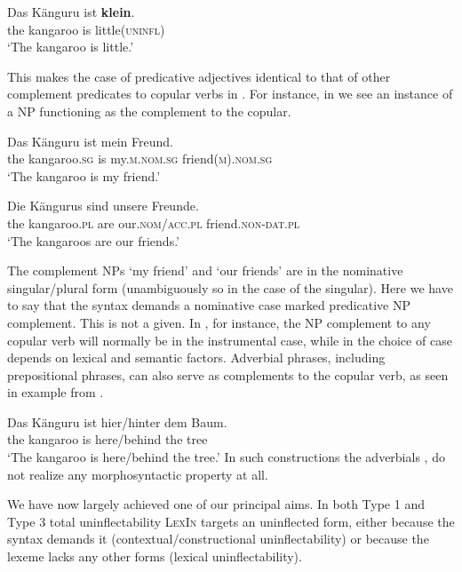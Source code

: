 \documentclass[output=paper,colorlinks,citecolor=brown]{langscibook}
\begin{document}
\begin{exe}
	\gll Das Känguru ist \textbf{klein}. \\
	the kangaroo is little\textsc{(uninfl)} \\
	\glt `The kangaroo is little.’
\end{exe}
	
\noindent%
This makes the case of predicative adjectives identical to that of other complement predicates to copular verbs in . For instance, in 
we see an instance of a NP functioning as  the complement to the copular.

\ea\label{freund}
\begin{xlist}
	\ex 
	\gll	Das Känguru ist mein Freund.	\\
	the kangaroo.\textsc{sg} is my.\textsc{m.nom.sg} friend\textsc{(m).nom.sg}	\\
	\glt	`The kangaroo is my friend.'

	\ex
	\gll	Die Kängurus sind unsere Freunde.	\\
	the kangaroo.\textsc{pl} are our.\textsc{nom/acc.pl} friend.\textsc{non-dat.pl}	\\
	\glt	`The kangaroos are our friends.'
\end{xlist}
\z
	
\noindent%
The complement NPs  `my friend' and   `our friends' are in the nominative singular/plural form (unambiguously so in the case of the singular). Here we have to say that the syntax  demands a nominative case marked predicative NP complement. This is not a given. In , for instance, the NP complement to any copular verb will normally be in the instrumental case, while in  the choice of case depends on lexical and semantic factors. Adverbial phrases, including prepositional phrases, can also serve as complements to the copular verb, as seen in example  from .

\ea \label{hier}
\gll	Das Känguru ist hier/hinter dem Baum.	\\
the kangaroo is here/behind the tree	\\
\glt	`The kangaroo is here/behind the tree.'
\z  
\noindent%
In such constructions  the adverbials , do not realize any morphosyntactic property at all.

We have now largely achieved one of our principal aims. In both Type 1 and Type 3 total uninflectability \textsc{LexIn} targets an uninflected  form, either because the syntax demands it (contextual/constructional uninflectability)  or because the lexeme lacks any other forms (lexical uninflectability). 
\end{document}
